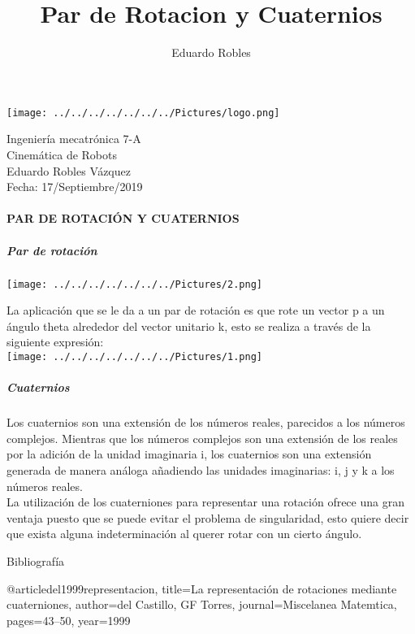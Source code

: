 \documentclass[12pt,a4paper]{report}
\author{Eduardo Robles}
\title{Par de Rotacion y Cuaternios}
\begin{document}
\begin{center}
\texttt{[image: ../../../../../../../Pictures/logo.png]} 
\end{center}
\begin{flushright}

Ingeniería mecatrónica 7-A\\
Cinemática de Robots \\
Eduardo Robles Vázquez\\
Fecha: 17/Septiembre/2019\\
\end{flushright}
\paragraph{PAR DE ROTACIÓN Y CUATERNIOS}
\subparagraph{Par de rotación}
\begin{center}
\texttt{[image: ../../../../../../../Pictures/2.png]} 
\end{center}
\begin{flushleft}
La aplicación que se le da a un par de rotación es que rote un vector p a un ángulo theta alrededor del vector unitario k, esto se realiza a través de la siguiente expresión:\\
\texttt{[image: ../../../../../../../Pictures/1.png]} 
\end{flushleft}
\subparagraph{Cuaternios}
\begin{flushleft}
Los cuaternios son una extensión de los números reales, parecidos a los números complejos. Mientras que los números complejos son una extensión de los reales por la adición de la unidad imaginaria i, los cuaternios son una extensión generada de manera análoga añadiendo las unidades imaginarias: i, j y k a los números reales.\\
La utilización de los cuaterniones para representar una rotación ofrece una gran ventaja puesto que se puede evitar el problema de singularidad, esto quiere decir que exista alguna indeterminación al querer rotar con un cierto ángulo.
\end{flushleft}
\begin{flushleft}
Bibliografía 
\end{flushleft}
@article{del1999representacion,
  title={La representaci{\'o}n de rotaciones mediante cuaterniones},
  author={del Castillo, GF Torres},
  journal={Miscelanea Matemtica},
  pages={43--50},
  year={1999}
}
\end{document}
